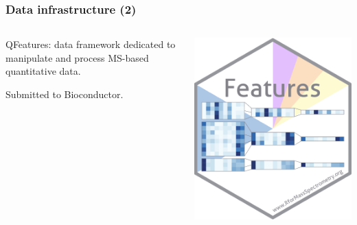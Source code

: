 \documentclass{beamer}
\newcommand{\frametitlesection}[1]{\frametitle{\centering #1 \footnotesize \hspace{0pt plus 1 filll} \insertsection}}
\begin{document}
\begin{frame}
\end{frame}

\begin{frame}
    \frametitlesection{Data infrastructure (2)}
    
    \centering
    
    \begin{columns}
        \begin{column}{0.8\textwidth}
            QFeatures: data framework dedicated to manipulate and process 
            MS-based quantitative data. 
            
            Submitted to Bioconductor.
        \end{column}
        \begin{column}{0.2\textwidth}
            \includegraphics[width=\linewidth]{figs/sticker_QFeatures.png}
        \end{column}
        
    \end{columns}
    
    \bigskip
    

\end{frame}
\end{document}
